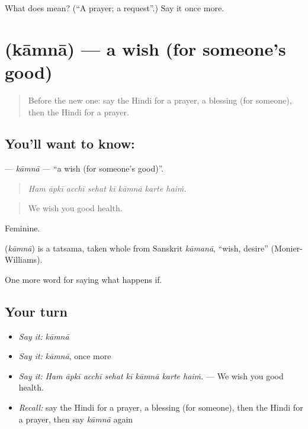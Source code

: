 \begin{tcolorbox}[breakable,colback=teal!4,colframe=teal!35!black,title={Before you move on}]
What does  mean? (\textquotedblleft{}A prayer; a request\textquotedblright{}.) Say it once more.
\end{tcolorbox}
\section[\texorpdfstring{\hi{कामना} (kāmnā)}{कामना (kāmnā)}]{ (kāmnā) — a wish (for someone's good)}

\label{lesson:HI-C539-kamna}



\begin{quote}
Before the new one: say the Hindi for a prayer, a blessing (for someone), then the Hindi for a prayer.
\end{quote}

\subsection*{You'll want to know: }
\textbf{} — \emph{kāmnā} — \textquotedblleft{}a wish (for someone's good)\textquotedblright{}.

\begin{quote}
       
\end{quote}

\begin{quote}
\emph{Ham āpkī acchī sehat kī kāmnā karte haiṁ.}
\end{quote}

\begin{quote}
We wish you good health.
\end{quote}

Feminine.

\begin{cousinweb}
\textbf{} (\emph{kāmnā}) is a tatsama, taken whole from Sanskrit \emph{kāmanā}, \textquotedblleft{}wish, desire\textquotedblright{} (Monier-Williams).
\end{cousinweb}

\begin{grammarlens}[title={What you've built}]
One more word for saying what happens if.
\end{grammarlens}

\subsection*{Your turn}
\begin{itemize}
\raggedright
  \item \emph{Say it:} \emph{kāmnā}
  \item \emph{Say it:} \emph{kāmnā}, once more
  \item \emph{Say it:} \emph{Ham āpkī acchī sehat kī kāmnā karte haiṁ.} — We wish you good health.
  \item \emph{Recall:} say the Hindi for a prayer, a blessing (for someone), then the Hindi for a prayer, then say \emph{kāmnā} again
\end{itemize}

